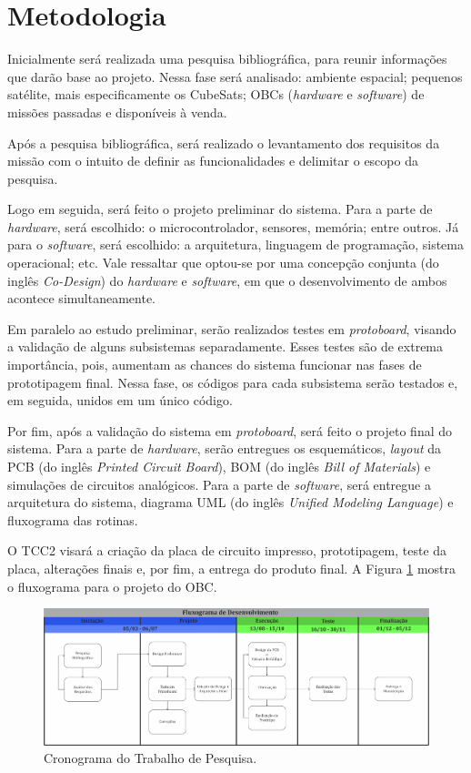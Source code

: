 \section{Metodologia}
\label{metodo}
Inicialmente será realizada uma pesquisa bibliográfica, para reunir informações que darão base ao projeto. Nessa fase será analisado: ambiente espacial; pequenos satélite, mais especificamente os CubeSats; OBCs (\textit{hardware} e \textit{software}) de missões passadas e disponíveis à venda.

Após a pesquisa bibliográfica, será realizado o levantamento dos requisitos da missão com o intuito de definir as funcionalidades e delimitar o escopo da pesquisa.

Logo em seguida, será feito o projeto preliminar do sistema. Para a parte de \textit{hardware}, será escolhido: o microcontrolador, sensores, memória; entre outros. Já para o \textit{software}, será escolhido: a arquitetura, linguagem de programação, sistema operacional; etc. Vale ressaltar que optou-se por uma concepção conjunta (do inglês \textit{Co-Design}) do \textit{hardware} e \textit{software}, em que o desenvolvimento de ambos acontece simultaneamente.

Em paralelo ao estudo preliminar, serão realizados testes em \textit{protoboard}, visando a validação de alguns subsistemas separadamente. Esses testes são de extrema importância, pois, aumentam as chances do sistema funcionar nas fases de prototipagem final. Nessa fase, os códigos para cada subsistema serão testados e, em seguida, unidos em um único código.

Por fim, após a validação do sistema em \textit{protoboard}, será feito o  projeto final do sistema. Para a parte de \textit{hardware}, serão entregues os esquemáticos, \textit{layout} da PCB (do inglês \textit{Printed Circuit Board}), BOM (do inglês \textit{Bill of Materials}) e simulações de circuitos analógicos. Para a parte de \textit{software}, será entregue a arquitetura do sistema, diagrama UML (do inglês \textit{Unified Modeling Language}) e fluxograma das rotinas.

O TCC2 visará a criação da placa de circuito impresso, prototipagem, teste da placa, alterações finais e, por fim, a entrega do produto final. A Figura \ref{fig01} mostra o fluxograma para o projeto do OBC.


\begin{figure}[!h]
\centerfloat
	\centering
\includegraphics[keepaspectratio=true,scale=0.54	]{figuras/cronograma_2.jpg}
	\caption{Cronograma do Trabalho de Pesquisa.}
	\label{fig01}
\end{figure}

